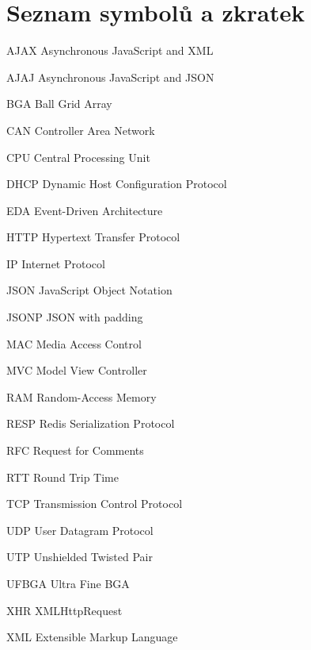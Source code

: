 \documentclass[oneside,12pt,a4paper,draft]{book} %
\makeatletter
\newcommand{\tocfill}{\cleaders\hbox{$\m@th \mkern\@dotsep mu . \mkern\@dotsep mu$}\hfill}
\newcommand{\abbrlabel}[1]{\makebox[6cm][l]{\textbf{#1}\ \tocfill}}
\newenvironment{abbreviations}{\begin{list}{}{\renewcommand{\makelabel}{\abbrlabel}%
        \setlength{\labelwidth}{6cm}\setlength{\leftmargin}{\labelwidth+\labelsep}%
                                              \setlength{\itemsep}{0pt}}}{\end{list}}
\makeatother
\begin{document}
\chapter*{Seznam symbolů a zkratek}
\noindent
\begin{abbreviations}
\item[AJAX]		Asynchronous JavaScript and XML
\item[AJAJ]		Asynchronous JavaScript and JSON
\item[BGA]		Ball Grid Array
\item[CAN]		Controller Area Network
\item[CPU]		Central Processing Unit
\item[DHCP]		Dynamic Host Configuration Protocol
\item[EDA]		Event-Driven Architecture
\item[HTTP]		Hypertext Transfer Protocol
\item[IP]		Internet Protocol
\item[JSON]		JavaScript Object Notation
\item[JSONP]	JSON with padding
\item[MAC]		Media Access Control
\item[MVC]		Model View Controller
\item[RAM]		Random-Access Memory
\item[RESP]		Redis Serialization Protocol
\item[RFC]		Request for Comments
\item[RTT]		Round Trip Time
\item[TCP]		Transmission Control Protocol
\item[UDP]		User Datagram Protocol
\item[UTP]		Unshielded Twisted Pair
\item[UFBGA]	Ultra Fine BGA
\item[XHR]		XMLHttpRequest
\item[XML]		Extensible Markup Language
\end{abbreviations}









\end{document}
